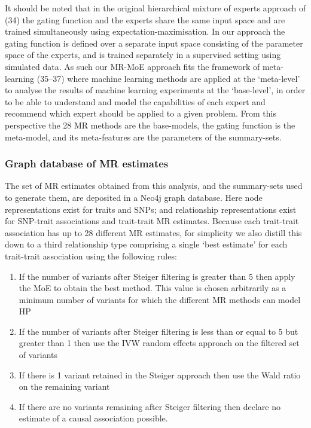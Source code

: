 \documentclass[]{article}
\providecommand{\tightlist}{%
  \setlength{\itemsep}{0pt}\setlength{\parskip}{0pt}}
\begin{document}
It should be noted that in the original hierarchical mixture of experts
approach of (34) the gating function and the experts share the same
input space and are trained simultaneously using
expectation-maximisation. In our approach the gating function is defined
over a separate input space consisting of the parameter space of the
experts, and is trained separately in a supervised setting using
simulated data. As such our MR-MoE approach fits the framework of
meta-learning (35--37) where machine learning methods are applied at the
`meta-level' to analyse the results of machine learning experiments at
the `base-level', in order to be able to understand and model the
capabilities of each expert and recommend which expert should be applied
to a given problem. From this perspective the 28 MR methods are the
base-models, the gating function is the meta-model, and its
meta-features are the parameters of the summary-sets.

\subsubsection{Graph database of MR
estimates}\label{graph-database-of-mr-estimates}

The set of MR estimates obtained from this analysis, and the
summary-sets used to generate them, are deposited in a Neo4j graph
database. Here node representations exist for traits and SNPs; and
relationship representations exist for SNP-trait associations and
trait-trait MR estimates. Because each trait-trait association has up to
28 different MR estimates, for simplicity we also distill this down to a
third relationship type comprising a single `best estimate' for each
trait-trait association using the following rules:

\begin{enumerate}
\def\labelenumi{\arabic{enumi}.}
\tightlist
\item
  If the number of variants after Steiger filtering is greater than 5
  then apply the MoE to obtain the best method. This value is chosen
  arbitrarily as a minimum number of variants for which the different MR
  methods can model HP
\item
  If the number of variants after Steiger filtering is less than or
  equal to 5 but greater than 1 then use the IVW random effects approach
  on the filtered set of variants
\item
  If there is 1 variant retained in the Steiger approach then use the
  Wald ratio on the remaining variant
\item
  If there are no variants remaining after Steiger filtering then
  declare no estimate of a causal association possible.
\end{enumerate}
\end{document}

